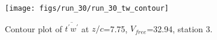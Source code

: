 \begin{figure}[H]
\centering
\texttt{[image: figs/run\_30/run\_30\_tw\_contour]}
\caption{Contour plot of $\overline{t^\prime w^\prime}$ at $z/c$=7.75, $V_{free}$=32.94, station 3.}
\label{fig:run_30_tw_contour}
\end{figure}


